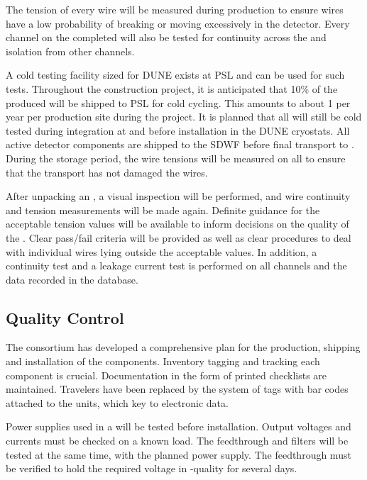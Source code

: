 The tension of every wire will be measured during production to ensure
wires have a low probability of breaking or moving excessively in the
detector. Every channel on the completed  will also be tested for
continuity across the  and isolation from other channels.

A cold testing facility sized for DUNE  exists at PSL and can be
used for such tests. Throughout the construction project, it is
anticipated that 10\% of the produced  will be shipped to PSL for
cold cycling. This amounts to about 1  per year per production site
during the project. It is planned that all  will still be cold
tested during integration at  and before installation in the DUNE
cryostats. All active detector components are shipped to the SDWF
before final transport to . During the storage period, the wire
tensions will be measured on all  to ensure that the transport has
not damaged the wires.

After unpacking an , a visual inspection will be performed, and
wire continuity and tension measurements will be made again. Definite
guidance for the acceptable tension values will be available to inform
decisions on the quality of the . Clear pass/fail criteria will be
provided as well as clear procedures to deal with individual wires
lying outside the acceptable values. In addition, a continuity test
and a leakage current test is performed on all channels and the data
recorded in the database.

\subsection{ Quality Control}

The  consortium has developed a comprehensive 
plan for the production, shipping and installation of the
  components. Inventory tagging and tracking
each component is crucial. Documentation in the form of printed
checklists are maintained. Travelers have been replaced by the system
of tags with bar codes attached to the units, which key to electronic
 data.

Power supplies used in a  will be tested before
installation. Output voltages and currents must be checked on a known
load. The feedthrough and filters will be tested at the same time,
with the planned power supply. The feedthrough must be verified to
hold the required voltage in -quality  for several days.

